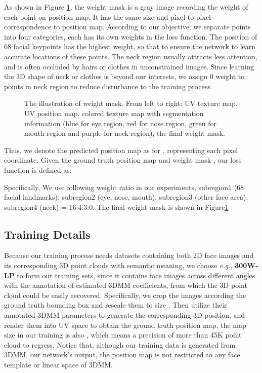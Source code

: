 \documentclass[runningheads]{llncs}
\begin{document}
As shown in Figure \ref{fig: weight mask}, the weight mask is a gray image recording the weight of each point on position map. It has the same size and pixel-to-pixel correspondence to position map. According to our objective, we separate points into four categories, each has its own weights in the loss function. 
The position of 68 facial keypoints has the highest weight, so that to ensure the network to learn accurate locations of these points.
The neck region usually attracts less attention, and is often occluded by hairs or clothes in unconstrained images. Since learning the 3D shape of neck or clothes is beyond our interests, we assign 0 weight to points in neck region to reduce disturbance to the training process.

\begin{figure}
\vspace{-3mm}
  \centering
\caption{The illustration of weight mask. From left to right: UV texture map, UV position map, colored texture map with segmentation information (blue for eye region, red for nose region, green for mouth region and purple for neck region), the final weight mask.}
\label{fig: weight mask}
\vspace{-5mm}
\end{figure}

Thus, we denote the predicted position map as  for ,  representing each pixel coordinate. Given the ground truth position map  and weight mask , our loss function is defined as:


Specifically, We use following weight ratio in our experiments, subregion1 (68 facial landmarks): subregion2 (eye, nose, mouth): subregion3 (other face area): subregion4 (neck) = 16:4:3:0. 
The final weight mask is shown in Figure\ref{fig: weight mask}

\subsection{Training Details}

Because our training process needs datasets containing both 2D face images and its corresponding 3D point clouds with semantic meaning, we choose \textit{e.g.}, \textbf{300W-LP}\cite{zhu2016face} to form our training sets, since it contains face images across different angles with the annotation of estimated 3DMM coefficients, from which the 3D point cloud could be easily recovered.
Specifically, we crop the images according the ground truth bounding box and rescale them to size . Then utilize their annotated 3DMM parameters to generate the corresponding 3D position, and render them into UV space to obtain the ground truth position map, the map size in our training is also , which means a precision of more than 45K point cloud to regress. 
Notice that, although our training data is generated from 3DMM, our network's output, the position map is not restricted to any face template or linear space of 3DMM.
\end{document}
